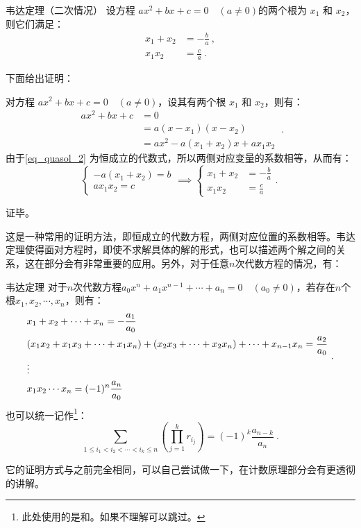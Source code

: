 \begin{theorem}{韦达定理（二次情况）}
设方程 $a x^2 + b x + c = 0\quad(a \neq 0)$的两个根为 $x_1$ 和 $x_2$，则它们满足：
$$\begin{aligned}
x_1 + x_2 &= -\frac{b}{a} ~,\\
x_1 x_2 &= \frac{c}{a}~.
\end{aligned}$$
\end{theorem}

下面给出证明：

对方程 $a x^2 + b x + c = 0\quad(a \neq 0)$，设其有两个根 $x_1$ 和 $x_2$，则有：
\begin{equation}\label{eq_quasol_2}
\begin{split}
ax^2+bx+c &= 0 \\ 
&=a(x-x_1)(x-x_2)\\
&=ax^2-a(x_1+x_2)x+ax_1x_2
\end{split}~.
\end{equation}
由于\autoref{eq_quasol_2} 为恒成立的代数式，所以两侧对应变量的系数相等，从而有：
\begin{equation}
\begin{cases}
-a(x_1+x_2)=b\\
ax_1x_2=c
\end{cases}
\implies
\begin{cases}
x_1 + x_2 &= \displaystyle-\frac{b}{a} \\
x_1 x_2 &= \displaystyle\frac{c}{a}
\end{cases}.~
\end{equation}

证毕。

这是一种常用的证明方法，即恒成立的代数方程，两侧对应位置的系数相等。韦达定理使得面对方程时，即使不求解具体的解的形式，也可以描述两个解之间的关系，这在部分会有非常重要的应用。另外，对于任意$n$次代数方程的情况，有：
\begin{theorem}{韦达定理}
对于$n$次代数方程$a_0x^n+a_1x^{n-1}+\cdots+a_n=0\quad(a_0\neq0)$，若存在$n$个根$x_1,x_2,\cdots,x_n$，则有：
\begin{equation}
\begin{split}
&x_1+x_2+\cdots +x_n=-{a_1\over a_0}\\
&(x_1x_2+x_1x_3+\cdots+ x_1x_n)+(x_2x_3+\cdots +x_2x_n)+\cdots+x_{n-1}x_n={a_2\over a_0}\\
&\vdots\\
&x_1x_2\cdots x_n=(-1)^n{a_n\over a_0}
\end{split}~.
\end{equation}
也可以统一记作\footnote{此处使用的是和。如果不理解可以跳过。}：
\begin{equation}
\sum_{1\le i_1 < i_2 < \cdots < i_k\le n} \left(\prod_{j = 1}^k r_{i_j}\right)=(-1)^k\frac{a_{n-k}}{a_n}~.
\end{equation}
\end{theorem}

它的证明方式与之前完全相同，可以自己尝试做一下，在计数原理部分会有更透彻的讲解。